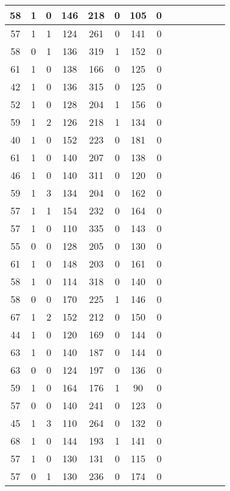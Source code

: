 \documentclass{article}
\begin{document}
\begin{longtable}{|c|c|c|c|c|c|c|c|c|c|c|c|c|c|}
\hline
58 & 1 & 0 & 146 & 218 & 0 & 105 & 0\\
\hline
57 & 1 & 1 & 124 & 261 & 0 & 141 & 0\\
\hline
58 & 0 & 1 & 136 & 319 & 1 & 152 & 0\\
\hline
61 & 1 & 0 & 138 & 166 & 0 & 125 & 0\\
\hline
42 & 1 & 0 & 136 & 315 & 0 & 125 & 0\\
\hline
52 & 1 & 0 & 128 & 204 & 1 & 156 & 0\\
\hline
59 & 1 & 2 & 126 & 218 & 1 & 134 & 0\\
\hline
40 & 1 & 0 & 152 & 223 & 0 & 181 & 0\\
\hline
61 & 1 & 0 & 140 & 207 & 0 & 138 & 0\\
\hline
46 & 1 & 0 & 140 & 311 & 0 & 120 & 0\\
\hline
59 & 1 & 3 & 134 & 204 & 0 & 162 & 0\\
\hline
57 & 1 & 1 & 154 & 232 & 0 & 164 & 0\\
\hline
57 & 1 & 0 & 110 & 335 & 0 & 143 & 0\\
\hline
55 & 0 & 0 & 128 & 205 & 0 & 130 & 0\\
\hline
61 & 1 & 0 & 148 & 203 & 0 & 161 & 0\\
\hline
58 & 1 & 0 & 114 & 318 & 0 & 140 & 0\\
\hline
58 & 0 & 0 & 170 & 225 & 1 & 146 & 0\\
\hline
67 & 1 & 2 & 152 & 212 & 0 & 150 & 0\\
\hline
44 & 1 & 0 & 120 & 169 & 0 & 144 & 0\\
\hline
63 & 1 & 0 & 140 & 187 & 0 & 144 & 0\\
\hline
63 & 0 & 0 & 124 & 197 & 0 & 136 & 0\\
\hline
59 & 1 & 0 & 164 & 176 & 1 & 90 & 0\\
\hline
57 & 0 & 0 & 140 & 241 & 0 & 123 & 0\\
\hline
45 & 1 & 3 & 110 & 264 & 0 & 132 & 0\\
\hline
68 & 1 & 0 & 144 & 193 & 1 & 141 & 0\\
\hline
57 & 1 & 0 & 130 & 131 & 0 & 115 & 0\\
\hline
57 & 0 & 1 & 130 & 236 & 0 & 174 & 0\\
\hline
\end{longtable}
\end{document}
